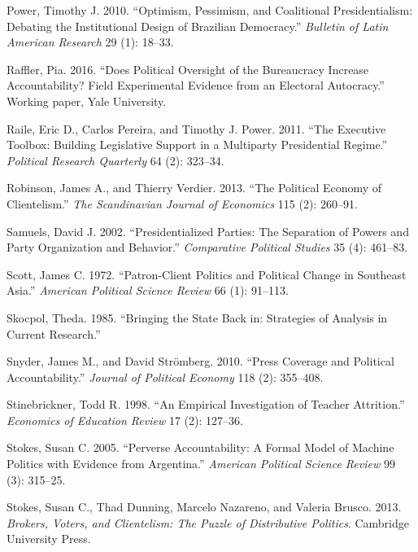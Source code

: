 \documentclass[12pt,]{article}
\begin{document}
\leavevmode\hypertarget{ref-power_optimism_2010}{}%
Power, Timothy J. 2010. ``Optimism, Pessimism, and Coalitional
Presidentialism: Debating the Institutional Design of Brazilian
Democracy.'' \emph{Bulletin of Latin American Research} 29 (1): 18--33.

\leavevmode\hypertarget{ref-raffler_does_2016}{}%
Raffler, Pia. 2016. ``Does Political Oversight of the Bureaucracy
Increase Accountability? Field Experimental Evidence from an Electoral
Autocracy.'' Working paper, Yale University.

\leavevmode\hypertarget{ref-raile_executive_2011}{}%
Raile, Eric D., Carlos Pereira, and Timothy J. Power. 2011. ``The
Executive Toolbox: Building Legislative Support in a Multiparty
Presidential Regime.'' \emph{Political Research Quarterly} 64 (2):
323--34.

\leavevmode\hypertarget{ref-robinson_political_2013}{}%
Robinson, James A., and Thierry Verdier. 2013. ``The Political Economy
of Clientelism.'' \emph{The Scandinavian Journal of Economics} 115 (2):
260--91.

\leavevmode\hypertarget{ref-samuels_presidentialized_2002}{}%
Samuels, David J. 2002. ``Presidentialized Parties: The Separation of
Powers and Party Organization and Behavior.'' \emph{Comparative
Political Studies} 35 (4): 461--83.

\leavevmode\hypertarget{ref-scott_patron-client_1972}{}%
Scott, James C. 1972. ``Patron-Client Politics and Political Change in
Southeast Asia.'' \emph{American Political Science Review} 66 (1):
91--113.

\leavevmode\hypertarget{ref-skocpol_bringing_1985}{}%
Skocpol, Theda. 1985. ``Bringing the State Back in: Strategies of
Analysis in Current Research.''

\leavevmode\hypertarget{ref-snyder_press_2010}{}%
Snyder, James M., and David Strömberg. 2010. ``Press Coverage and
Political Accountability.'' \emph{Journal of Political Economy} 118 (2):
355--408.

\leavevmode\hypertarget{ref-stinebrickner_empirical_1998}{}%
Stinebrickner, Todd R. 1998. ``An Empirical Investigation of Teacher
Attrition.'' \emph{Economics of Education Review} 17 (2): 127--36.

\leavevmode\hypertarget{ref-stokes_perverse_2005}{}%
Stokes, Susan C. 2005. ``Perverse Accountability: A Formal Model of
Machine Politics with Evidence from Argentina.'' \emph{American
Political Science Review} 99 (3): 315--25.

\leavevmode\hypertarget{ref-stokes_brokers_2013}{}%
Stokes, Susan C., Thad Dunning, Marcelo Nazareno, and Valeria Brusco.
2013. \emph{Brokers, Voters, and Clientelism: The Puzzle of Distributive
Politics}. Cambridge University Press.
\end{document}
